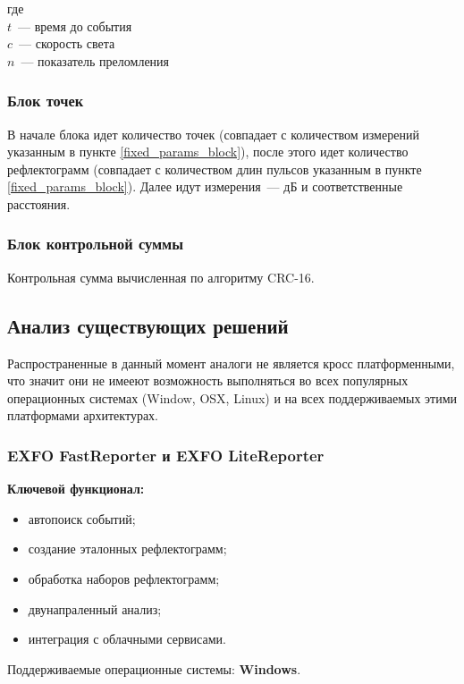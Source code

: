 \noindent где \\
$t$~--- время до события \\
$c$~--- скорость света \\
$n$~--- показатель преломления

\subsubsection{Блок точек}

В начале блока идет количество точек (совпадает с количеством измерений указанным в пункте \ref{fixed_params_block}), после этого идет количество рефлектограмм (совпадает с количеством длин пульсов указанным в пункте \ref{fixed_params_block}). Далее идут измерения~--- дБ и соответственные расстояния.

\subsubsection{Блок контрольной суммы}

Контрольная сумма вычисленная по алгоритму CRC-16.

\subsection{Анализ существующих решений}

Распространенные в данный момент аналоги не является кросс платформенными, что значит они не имееют возможность выполняться во всех популярных операционных системах (Window, OSX, Linux) и на всех поддерживаемых этими платформами архитектурах.

\subsubsection{EXFO FastReporter и EXFO LiteReporter}

\textbf{Ключевой функционал:} \cite{web:fastreporter_specs}
\begin{itemize}
  \item автопоиск событий;
  \item создание эталонных рефлектограмм;
  \item обработка наборов рефлектограмм;
  \item двунапраленный анализ;
  \item интеграция с облачными сервисами.
\end{itemize}

Поддерживаемые операционные системы: \textbf{Windows}.

